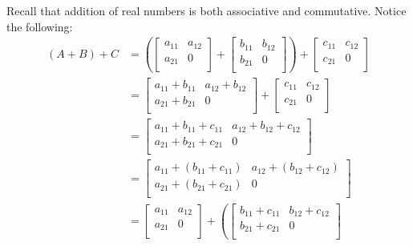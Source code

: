 \documentclass{article}
\begin{document}
Recall that addition of real numbers is both associative and commutative. Notice the following:
\begin{align*}
  (A+B)+C&=\left(\begin{bmatrix}
    a_{11}  &a_{12}    \\
     a_{21} &0    \\
  \end{bmatrix}+\begin{bmatrix}
    b_{11}  &b_{12}    \\
     b_{21} &0    \\
  \end{bmatrix}\right)+\begin{bmatrix}
    c_{11}  &c_{12}    \\
     c_{21} &0   \\
  \end{bmatrix}\\
  &=\begin{bmatrix}
    a_{11}+b_{11}   & a_{12}+b_{12}    \\
     a_{21}+b_{21}  &   0\\
  \end{bmatrix}+\begin{bmatrix}
    c_{11}  &c_{12}    \\
     c_{21} &0   \\
  \end{bmatrix}\\
  &=\begin{bmatrix}
    a_{11}+b_{11}+c_{11}    & a_{12}+b_{12} +c_{12}    \\
     a_{21}+b_{21} +c_{21}  &   0\\
  \end{bmatrix}\\
  &=\begin{bmatrix}
    a_{11}+\left(b_{11}+c_{11}\right)    & a_{12}+\left(b_{12} +c_{12}\right)    \\
    a_{21}+\left(b_{21} +c_{21}\right)  &   0\\
  \end{bmatrix}\\
  &=\begin{bmatrix}
    a_{11}  &a_{12}    \\
     a_{21} &0    \\
  \end{bmatrix}+\left(\begin{bmatrix}
     b_{11}+c_{11}  &b_{12}+c_{12}     \\
     b_{21}+c_{21}  &0   \\

\end{bmatrix}
\end{align*}
\end{document}
